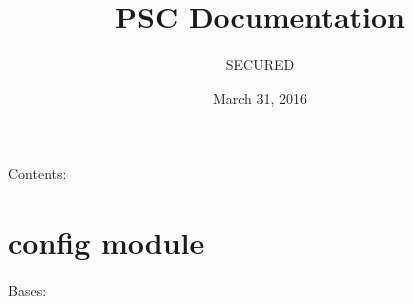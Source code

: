 \documentclass[letterpaper,10pt,oneside]{sphinxmanual}
\title{PSC Documentation}
\date{March 31, 2016}
\author{SECURED}
\begin{document}
\maketitle
\tableofcontents
{}\label{index::doc}


Contents:


\chapter{config module}
\label{config:welcome-to-psc-s-documentation}\label{config:module-config}\label{config::doc}\label{config:config-module}

\begin{fulllineitems}
\label{config:config.Configuration}
Bases: 

\begin{fulllineitems}
\label{config:config.Configuration.LOG_FILE}
\end{fulllineitems}


\begin{fulllineitems}
\label{config:config.Configuration.PSA_API_VERSION}
\end{fulllineitems}


\begin{fulllineitems}
\label{config:config.Configuration.PSA_CONFIG_PATH}
\end{fulllineitems}


\begin{fulllineitems}
\label{config:config.Configuration.PSA_LIST_ONLINE_PATH}
\end{fulllineitems}


\begin{fulllineitems}
\label{config:config.Configuration.PSA_LIST_PATH}
\end{fulllineitems}


\end{fulllineitems}
\end{document}
